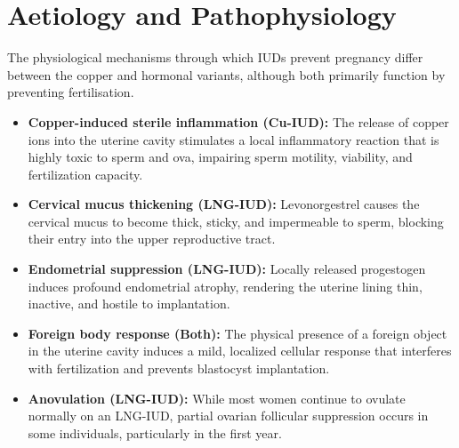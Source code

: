 \section*{Aetiology and Pathophysiology}
The physiological mechanisms through which IUDs prevent pregnancy differ between the copper and hormonal variants, although both primarily function by preventing fertilisation.
\begin{itemize}
    \item \textbf{Copper-induced sterile inflammation (Cu-IUD):} The release of copper ions into the uterine cavity stimulates a local inflammatory reaction that is highly toxic to sperm and ova, impairing sperm motility, viability, and fertilization capacity.
    \item \textbf{Cervical mucus thickening (LNG-IUD):} Levonorgestrel causes the cervical mucus to become thick, sticky, and impermeable to sperm, blocking their entry into the upper reproductive tract.
    \item \textbf{Endometrial suppression (LNG-IUD):} Locally released progestogen induces profound endometrial atrophy, rendering the uterine lining thin, inactive, and hostile to implantation.
    \item \textbf{Foreign body response (Both):} The physical presence of a foreign object in the uterine cavity induces a mild, localized cellular response that interferes with fertilization and prevents blastocyst implantation.
    \item \textbf{Anovulation (LNG-IUD):} While most women continue to ovulate normally on an LNG-IUD, partial ovarian follicular suppression occurs in some individuals, particularly in the first year.
\end{itemize}

